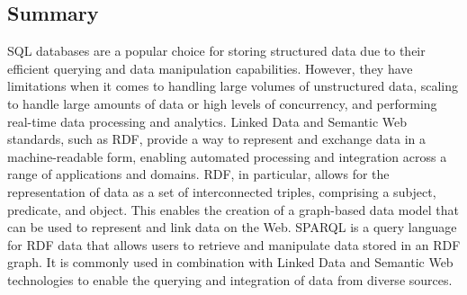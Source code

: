 \subsection{Summary}

SQL databases are a popular choice for storing structured data due to their efficient querying and data manipulation capabilities.  However, they have limitations when it comes to handling large volumes of unstructured data, scaling to handle large amounts of data or high levels of concurrency, and performing real-time data processing and analytics.  Linked Data and Semantic Web standards, such as RDF, provide a way to represent and exchange data in a machine-readable form, enabling automated processing and integration across a range of applications and domains.  RDF, in particular, allows for the representation of data as a set of interconnected triples, comprising a subject, predicate, and object.  This enables the creation of a graph-based data model that can be used to represent and link data on the Web.  SPARQL is a query language for RDF data that allows users to retrieve and manipulate data stored in an RDF graph.  It is commonly used in combination with Linked Data and Semantic Web technologies to enable the querying and integration of data from diverse sources.
